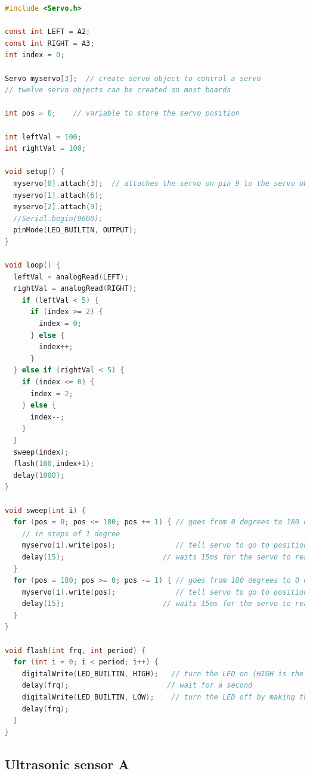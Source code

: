   \begin{lstlisting}[language=c,caption={Servo testing code B},label={lst:servo_test_b}]
#include <Servo.h>

const int LEFT = A2; 
const int RIGHT = A3;
int index = 0;

Servo myservo[3];  // create servo object to control a servo
// twelve servo objects can be created on most boards

int pos = 0;    // variable to store the servo position

int leftVal = 100;    
int rightVal = 100; 

void setup() {
  myservo[0].attach(3);  // attaches the servo on pin 9 to the servo object
  myservo[1].attach(6);
  myservo[2].attach(9);
  //Serial.begin(9600);
  pinMode(LED_BUILTIN, OUTPUT);
}

void loop() {
  leftVal = analogRead(LEFT);
  rightVal = analogRead(RIGHT);
    if (leftVal < 5) {
      if (index >= 2) {
        index = 0;
      } else {
        index++;
      }
  } else if (rightVal < 5) {
    if (index <= 0) {
      index = 2;
    } else {
      index--;
    }
  }
  sweep(index);
  flash(100,index+1);
  delay(1000);
}

void sweep(int i) {
  for (pos = 0; pos <= 180; pos += 1) { // goes from 0 degrees to 180 degrees
    // in steps of 1 degree
    myservo[i].write(pos);              // tell servo to go to position in variable 'pos'
    delay(15);                       // waits 15ms for the servo to reach the position
  }
  for (pos = 180; pos >= 0; pos -= 1) { // goes from 180 degrees to 0 degrees
    myservo[i].write(pos);              // tell servo to go to position in variable 'pos'
    delay(15);                       // waits 15ms for the servo to reach the position
  }
}

void flash(int frq, int period) {
  for (int i = 0; i < period; i++) {
    digitalWrite(LED_BUILTIN, HIGH);   // turn the LED on (HIGH is the voltage level)
    delay(frq);                       // wait for a second
    digitalWrite(LED_BUILTIN, LOW);    // turn the LED off by making the voltage LOW
    delay(frq);
  }
}
\end{lstlisting}

\subsection*{Ultrasonic sensor A}

